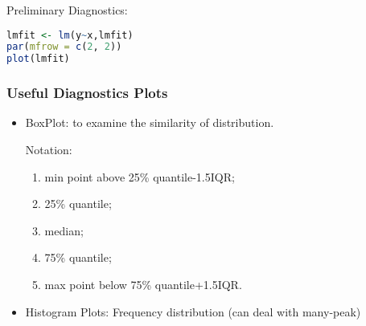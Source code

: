     \noindent Preliminary Diagnostics:

\begin{rcode}
\begin{lstlisting}[language=R]
lmfit <- lm(y~x,lmfit)
par(mfrow = c(2, 2))
plot(lmfit)
\end{lstlisting}
\end{rcode}
    

\subsubsection{Useful Diagnostics Plots}

        \begin{itemize}[topsep=2pt,itemsep=2pt]
            \item BoxPlot: to examine the similarity of  distribution.
            
            Notation:
            \begin{enumerate}[topsep=2pt,itemsep=2pt]
                \item min point above 25\% quantile-1.5IQR;
                \item 25\% quantile;
                \item median;
                \item 75\% quantile;
                \item max point below 75\% quantile+1.5IQR.
            \end{enumerate}
            
                
            \begin{center}
            \end{center}


    
            

        \item Histogram Plots: Frequency distribution (can deal with many-peak)
            

\end{itemize}
